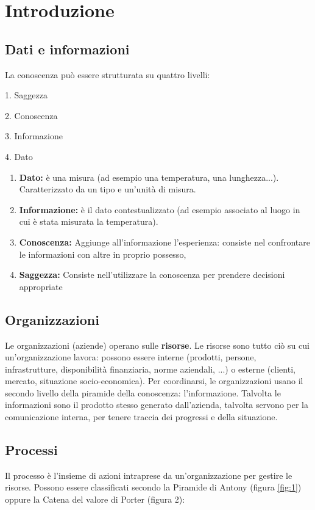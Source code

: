 \documentclass[\main/main.tex]{subfiles}
\begin{document}
\section{Introduzione}
\subsection{Dati e informazioni}
La conoscenza può essere strutturata su quattro livelli:

\begin{center}
  1. Saggezza

  2. Conoscenza

  3. Informazione

  4. Dato
\end{center}


\begin{enumerate}
  \item \textbf{Dato:} è una misura (ad esempio una temperatura, una lunghezza...). Caratterizzato da un tipo e un'unità di misura.
  \item \textbf{Informazione:} è il dato contestualizzato (ad esempio associato al luogo in cui è stata misurata la temperatura).
  \item \textbf{Conoscenza:} Aggiunge all'informazione l'esperienza: consiste nel confrontare le informazioni con altre in proprio possesso,
  \item \textbf{Saggezza:} Consiste nell'utilizzare la conoscenza per prendere decisioni appropriate
\end{enumerate}

\subsection{Organizzazioni}
Le organizzazioni (aziende) operano sulle \textbf{risorse}. Le risorse sono tutto ciò su cui un'organizzazione lavora: possono essere interne (prodotti, persone, infrastrutture, disponibilità finanziaria, norme aziendali, ...) o esterne (clienti, mercato, situazione socio-economica).
Per coordinarsi, le organizzazioni usano il secondo livello della piramide della conoscenza: l'informazione. Talvolta le informazioni sono il prodotto stesso generato dall'azienda, talvolta servono per la comunicazione interna, per tenere traccia dei progressi e della situazione.

\subsection{Processi}
Il processo è l'insieme di azioni intraprese da un'organizzazione per gestire le risorse.
Possono essere classificati secondo la Piramide di Antony (figura \ref{fig:1}) oppure la Catena del valore di Porter (figura 2):
\end{document}
